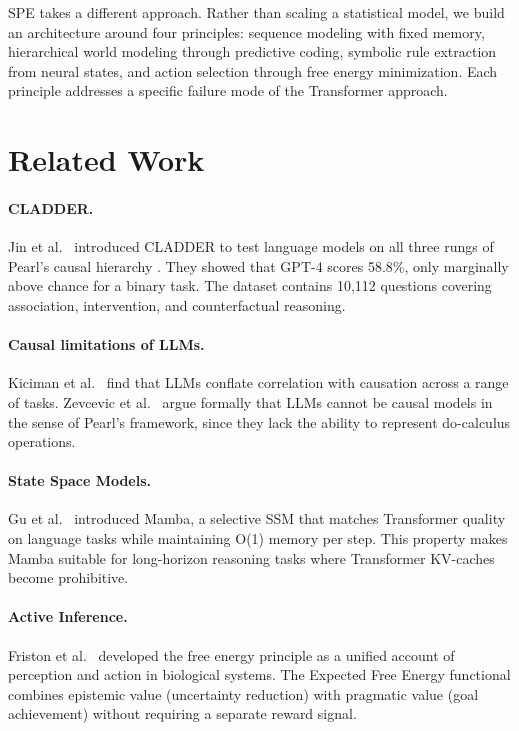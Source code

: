 \documentclass{article}
\begin{document}
SPE takes a different approach. Rather than scaling a statistical model,
we build an architecture around four principles: sequence modeling with
fixed memory, hierarchical world modeling through predictive coding,
symbolic rule extraction from neural states, and action selection through
free energy minimization. Each principle addresses a specific failure mode
of the Transformer approach.

\section{Related Work}

\paragraph{CLADDER.}
Jin et al.\ \cite{jin2023cladder} introduced CLADDER to test language
models on all three rungs of Pearl's causal hierarchy \cite{pearl2009causality}.
They showed that GPT-4 scores 58.8\%, only marginally above chance for a
binary task. The dataset contains 10,112 questions covering association,
intervention, and counterfactual reasoning.

\paragraph{Causal limitations of LLMs.}
Kiciman et al.\ \cite{kiciman2023causal} find that LLMs conflate
correlation with causation across a range of tasks. Zevcevic et al.\
\cite{zevcevic2023causal} argue formally that LLMs cannot be causal
models in the sense of Pearl's framework, since they lack the ability to
represent do-calculus operations.

\paragraph{State Space Models.}
Gu et al.\ \cite{gu2023mamba} introduced Mamba, a selective SSM that
matches Transformer quality on language tasks while maintaining O(1)
memory per step. This property makes Mamba suitable for long-horizon
reasoning tasks where Transformer KV-caches become prohibitive.

\paragraph{Active Inference.}
Friston et al.\ \cite{friston2010free} developed the free energy principle
as a unified account of perception and action in biological systems. The
Expected Free Energy functional combines epistemic value (uncertainty
reduction) with pragmatic value (goal achievement) without requiring a
separate reward signal.
\end{document}
